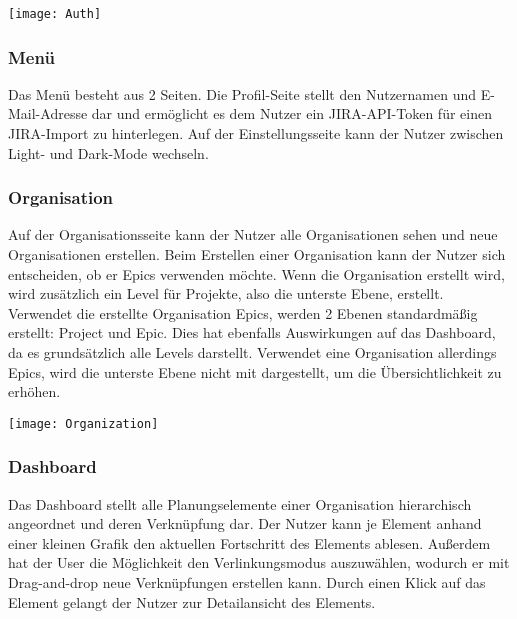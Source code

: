 \vspace{20pt}
\begin{center}
    \begin{minipage}{\linewidth}
        \texttt{[image: Auth]}
    \end{minipage}
\end{center}
\vspace{20pt}

\subsubsection{Menü}
Das Menü besteht aus 2 Seiten. Die Profil-Seite stellt den Nutzernamen und E-Mail-Adresse dar und ermöglicht es dem Nutzer ein JIRA-API-Token für einen JIRA-Import zu hinterlegen. Auf der Einstellungsseite kann der Nutzer zwischen Light- und Dark-Mode wechseln.

\subsubsection{Organisation}
Auf der Organisationsseite kann der Nutzer alle Organisationen sehen und neue Organisationen erstellen. Beim Erstellen einer Organisation kann der Nutzer sich entscheiden, ob er Epics verwenden möchte. Wenn die Organisation erstellt wird, wird zusätzlich ein Level für Projekte, also die unterste Ebene, erstellt. Verwendet die erstellte Organisation Epics, werden 2 Ebenen standardmäßig erstellt: Project und Epic. Dies hat ebenfalls Auswirkungen auf das Dashboard, da es grundsätzlich alle Levels darstellt. Verwendet eine Organisation allerdings Epics, wird die unterste Ebene nicht mit dargestellt, um die Übersichtlichkeit zu erhöhen.

\vspace{20pt}
\begin{center}
    \begin{minipage}{\linewidth}
        \texttt{[image: Organization]}
    \end{minipage}
\end{center}
\vspace{20pt}


\subsubsection{Dashboard}
Das Dashboard stellt alle Planungselemente einer Organisation hierarchisch angeordnet und deren Verknüpfung dar. Der Nutzer kann je Element anhand einer kleinen Grafik den aktuellen Fortschritt des Elements ablesen. Außerdem hat der User die Möglichkeit den Verlinkungsmodus auszuwählen, wodurch er mit Drag-and-drop neue Verknüpfungen erstellen kann. Durch einen Klick auf das Element gelangt der Nutzer zur Detailansicht des Elements.

